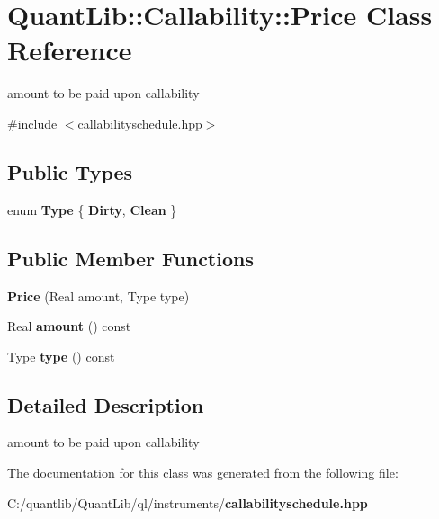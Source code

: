 \section{Quant\+Lib\+:\+:Callability\+:\+:Price Class Reference}
\label{class_quant_lib_1_1_callability_1_1_price}


amount to be paid upon callability  




{\ttfamily \#include $<$callabilityschedule.\+hpp$>$}

\subsection*{Public Types}
\begin{DoxyCompactItemize}
\item 
enum {\bfseries Type} \{ {\bfseries Dirty}, 
{\bfseries Clean}
 \}\label{class_quant_lib_1_1_callability_1_1_price_a965114f018082a1cda514e3f384625cd}

\end{DoxyCompactItemize}
\subsection*{Public Member Functions}
\begin{DoxyCompactItemize}
\item 
{\bfseries Price} (Real amount, Type type)\label{class_quant_lib_1_1_callability_1_1_price_a2d0af598c9c25ed7ef376c92316b99a4}

\item 
Real {\bfseries amount} () const \label{class_quant_lib_1_1_callability_1_1_price_abd9dea37c79c7880227a5569d1fa731e}

\item 
Type {\bfseries type} () const \label{class_quant_lib_1_1_callability_1_1_price_a9c2a80a65b8d9a78cfe4eb55d2fcb5b8}

\end{DoxyCompactItemize}


\subsection{Detailed Description}
amount to be paid upon callability 

The documentation for this class was generated from the following file\+:\begin{DoxyCompactItemize}
\item 
C\+:/quantlib/\+Quant\+Lib/ql/instruments/{\bf callabilityschedule.\+hpp}\end{DoxyCompactItemize}
